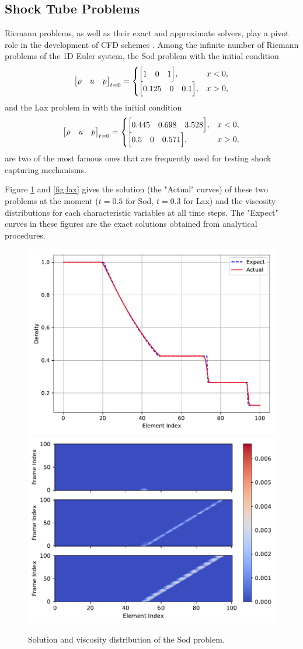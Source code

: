 \documentclass[10pt,draft]{article}
\begin{document}
\subsection{Shock Tube Problems}
Riemann problems, as well as their exact and approximate solvers, play a pivot role in the development of CFD schemes \cite{Toro_2009}.
Among the infinite number of Riemann problems of the 1D Euler system, the Sod problem with the initial condition
\begin{equation}
\mqty[\rho & u & p]_{t=0}
=
\begin{cases}
\mqty[1 & 0 & 1], &x<0,\\
\mqty[0.125 & 0 & 0.1], &x>0,\\
\end{cases}
\end{equation}
and the Lax problem in with the initial condition
\begin{equation}
\mqty[\rho & u & p]_{t=0}
=
\begin{cases}
\mqty[0.445 & 0.698 & 3.528], &x<0,\\
\mqty[0.5 & 0 & 0.571], &x>0,\\
\end{cases}
\end{equation}
are two of the most famous ones that are frequently used for testing shock capturing mechanisms.

Figure \ref{fig:sod} and \ref{fig:lax} gives the solution (the "Actual" curves) of these two problems at the moment ($t=0.5$ for Sod, $t=0.3$ for Lax) and the viscosity distributions for each characteristic variables at all time steps.
The "Expect" curves in these figures are the exact solutions obtained from analytical procedures.
\begin{figure}[H]
  \centering
  \includegraphics[width=.49\textwidth]{./sod/Frame100.pdf}
  \includegraphics[width=.49\textwidth]{./sod/Viscosity.pdf}
  \caption{Solution and viscosity distribution of the Sod problem.}
  \label{fig:sod}
\end{figure}
\end{document}
